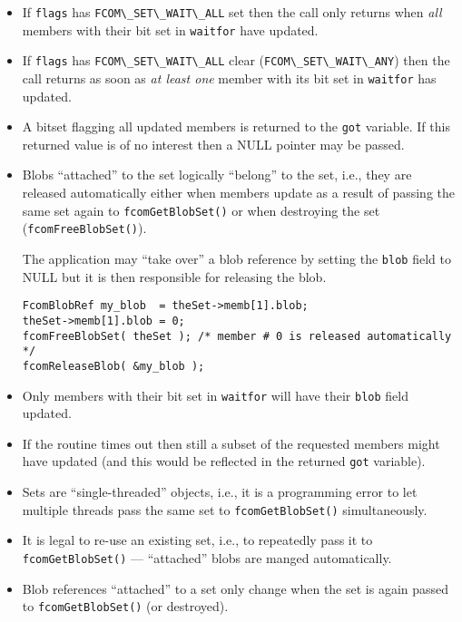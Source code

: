 \documentclass[11pt]{article}
\newcommand{\blob}{blob}
\newcommand{\Blob}{Blob}
\newcommand{\set}{set}
\newcommand{\Set}{Set}
\newcommand{\cstl}[1]{{\lstinline+#1+}}
\begin{document}
      \begin{itemize}
        \item If \cstl{flags} has \cstl{FCOM\_SET\_WAIT\_ALL} set then the call
              only returns when {\em all} members with their bit set in \cstl{waitfor}
              have updated.
        \item If \cstl{flags} has \cstl{FCOM\_SET\_WAIT\_ALL} clear
              (\cstl{FCOM\_SET\_WAIT\_ANY}) then the call returns as soon as {\em at least
              one} member with its bit set in \cstl{waitfor} has updated.
        \item A bitset flagging all updated members is returned to the \cstl{got}
              variable. If this returned value is of no interest then a NULL pointer 
              may be passed.
        \item \Blob{}s ``attached'' to the \set{} logically ``belong'' to the \set,
              i.e., they are released automatically either when members update
              as a result of passing the same \set{} again to \cstl{fcomGetBlobSet()}
              or when destroying the \set{} (\cstl{fcomFreeBlobSet()}).

              The application may ``take over'' a \blob{} reference by setting
              the \cstl{blob} field to NULL but it is then responsible for releasing
              the \blob.
\begin{verbatim}
FcomBlobRef my_blob  = theSet->memb[1].blob;
theSet->memb[1].blob = 0;
fcomFreeBlobSet( theSet ); /* member # 0 is released automatically */
fcomReleaseBlob( &my_blob );
\end{verbatim}
        \item Only members with their bit set in \cstl{waitfor} will have their
              \cstl{blob} field updated.
        \item If the routine times out then still a subset of the requested members
              might have updated (and this would be reflected in the returned \cstl{got}
              variable).
        \item \Set{}s are ``single-threaded'' objects, i.e., it is a programming error
              to let multiple threads pass the same \set{} to \cstl{fcomGetBlobSet()}
              simultaneously.
        \item It is legal to re-use an existing \set{}, i.e., to repeatedly pass it to
              \cstl{fcomGetBlobSet()} --- ``attached'' blobs are manged automatically.
        \item \Blob{} references ``attached'' to a \set{} only change when the \set{}
              is again passed to \cstl{fcomGetBlobSet()} (or destroyed).
      \end{itemize}
\end{document}
